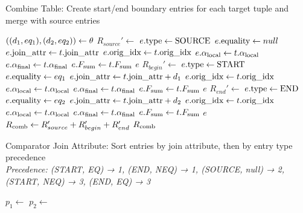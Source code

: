 \begin{algorithm}[H]
\caption{Combine Table: Create start/end boundary entries for each target tuple and merge with source entries}
\label{alg:combine-table}
\begin{algorithmic}[1]
    \State $((d_1, eq_1), (d_2, eq_2)) \leftarrow \theta$
    \State $R_{source}' \leftarrow$ 
    \State \quad $e.\text{type} \leftarrow \text{SOURCE}$
    \State \quad $e.\text{equality} \leftarrow null$
    \State \quad $e.\text{join\_attr} \leftarrow t.\text{join\_attr}$
    \State \quad $e.\text{orig\_idx} \leftarrow t.\text{orig\_idx}$
    \State \quad $e.\alpha_{\text{local}} \leftarrow t.\alpha_{\text{local}}$
    \State \quad $e.\alpha_{\text{final}} \leftarrow t.\alpha_{\text{final}}$
    \State \quad $e.F_{\text{sum}} \leftarrow t.F_{\text{sum}}$
    \State \quad \Return $e$
    \State $R_{begin}' \leftarrow$ 
    \State \quad $e.\text{type} \leftarrow \text{START}$
    \State \quad $e.\text{equality} \leftarrow eq_1$
    \State \quad $e.\text{join\_attr} \leftarrow t.\text{join\_attr} + d_1$
    \State \quad $e.\text{orig\_idx} \leftarrow t.\text{orig\_idx}$
    \State \quad $e.\alpha_{\text{local}} \leftarrow t.\alpha_{\text{local}}$
    \State \quad $e.\alpha_{\text{final}} \leftarrow t.\alpha_{\text{final}}$
    \State \quad $e.F_{\text{sum}} \leftarrow t.F_{\text{sum}}$
    \State \quad \Return $e$
    \State $R_{end}' \leftarrow$ 
    \State \quad $e.\text{type} \leftarrow \text{END}$
    \State \quad $e.\text{equality} \leftarrow eq_2$
    \State \quad $e.\text{join\_attr} \leftarrow t.\text{join\_attr} + d_2$
    \State \quad $e.\text{orig\_idx} \leftarrow t.\text{orig\_idx}$
    \State \quad $e.\alpha_{\text{local}} \leftarrow t.\alpha_{\text{local}}$
    \State \quad $e.\alpha_{\text{final}} \leftarrow t.\alpha_{\text{final}}$
    \State \quad $e.F_{\text{sum}} \leftarrow t.F_{\text{sum}}$
    \State \quad \Return $e$
    \State $R_{\text{comb}} \leftarrow R_{source}' + R_{begin}' + R_{end}'$
    \State \Return $R_{\text{comb}}$
\EndFunction
\end{algorithmic}
\end{algorithm}

\begin{algorithm}[H]
\caption{Comparator Join Attribute: Sort entries by join attribute, then by entry type precedence\\
\small\textit{Precedence: (START, EQ) → 1, (END, NEQ) → 1, (SOURCE, null) → 2, (START, NEQ) → 3, (END, EQ) → 3}}
\label{alg:comparator-join-attr}
\begin{algorithmic}[1]
    \Else
        \State $p_1 \leftarrow$ 
        \State $p_2 \leftarrow$ 
        \Else
        \EndIf
    \EndIf
\EndFunction
\end{algorithmic}
\end{algorithm}

